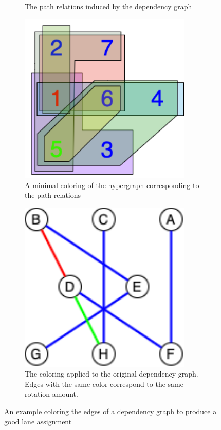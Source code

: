 \begin{figure}
\begin{subfigure}{0.24\textwidth}
        \caption{The path relations induced by the dependency graph}\label{fig:path-relations}
    \end{subfigure}
    \begin{subfigure}{0.24\textwidth}
        \includegraphics[width=0.9\textwidth]{figures/hypergraph_coloring/colored_dependency_hypergraph.drawio.png}
        \caption{A minimal coloring of the hypergraph corresponding to the path relations}\label{fig:colored-hypergraph}
    \end{subfigure}
    \begin{subfigure}{0.24\textwidth}
        \includegraphics[width=0.9\textwidth]{figures/hypergraph_coloring/colored_dependency_graph.drawio.png}
        \caption{The coloring applied to the original dependency graph. Edges with the same color correspond to the same rotation amount.}\label{fig:colored-dependency-graph}
    \end{subfigure}
    \caption{An example coloring the edges of a dependency graph to produce a good lane assignment}\label{fig:lane-assignment}
\end{figure}
